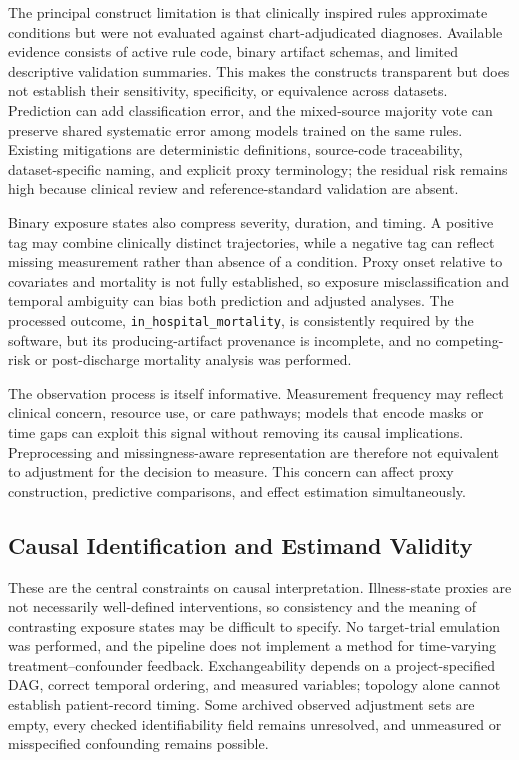 The principal construct limitation is that clinically inspired rules approximate conditions but were not evaluated against chart-adjudicated diagnoses.  Available evidence consists of active rule code, binary artifact schemas, and limited descriptive validation summaries.  This makes the constructs transparent but does not establish their sensitivity, specificity, or equivalence across datasets.  Prediction can add classification error, and the mixed-source majority vote can preserve shared systematic error among models trained on the same rules.  Existing mitigations are deterministic definitions, source-code traceability, dataset-specific naming, and explicit proxy terminology; the residual risk remains high because clinical review and reference-standard validation are absent.

Binary exposure states also compress severity, duration, and timing.  A positive tag may combine clinically distinct trajectories, while a negative tag can reflect missing measurement rather than absence of a condition.  Proxy onset relative to covariates and mortality is not fully established, so exposure misclassification and temporal ambiguity can bias both prediction and adjusted analyses.  The processed outcome, \texttt{in\_hospital\_mortality}, is consistently required by the software, but its producing-artifact provenance is incomplete, and no competing-risk or post-discharge mortality analysis was performed.

The observation process is itself informative.  Measurement frequency may reflect clinical concern, resource use, or care pathways; models that encode masks or time gaps can exploit this signal without removing its causal implications.  Preprocessing and missingness-aware representation are therefore not equivalent to adjustment for the decision to measure.  This concern can affect proxy construction, predictive comparisons, and effect estimation simultaneously.

\subsection{Causal Identification and Estimand Validity}
\label{subsec:discussion:identification-estimand-validity}

These are the central constraints on causal interpretation.  Illness-state proxies are not necessarily well-defined interventions, so consistency and the meaning of contrasting exposure states may be difficult to specify.  No target-trial emulation was performed, and the pipeline does not implement a method for time-varying treatment--confounder feedback.  Exchangeability depends on a project-specified DAG, correct temporal ordering, and measured variables; topology alone cannot establish patient-record timing.  Some archived observed adjustment sets are empty, every checked identifiability field remains unresolved, and unmeasured or misspecified confounding remains possible.

